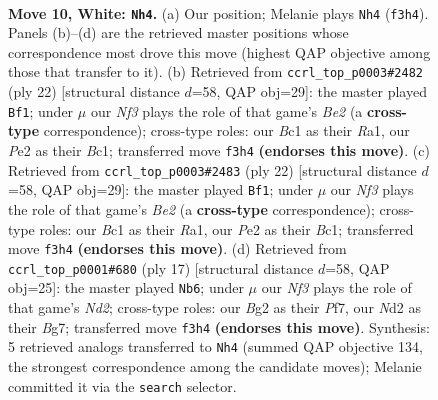 \documentclass[11pt]{article}
\begin{document}
\clearpage

\begin{figure}[p]\centering
\begin{subfigure}{0.46\textwidth}\centering
\resizebox{\linewidth}{!}{%
\newchessgame
\chessboard[
  setfen={r1bq1rk1/pp4pp/n1pb1n2/3p1p2/3P4/5NP1/PP1NPPBP/R1BQR1K1 w - - 4 10},
  showmover=false,
  pgfstyle=straightmove, color=movearrow, markmove={f3-h4}
]}
\caption{}
\end{subfigure}\hfill
\begin{subfigure}{0.46\textwidth}\centering
\resizebox{\linewidth}{!}{%
\newchessgame
\chessboard[
  setfen={2rq1rk1/ppn1ppbp/6pn/3p1b2/P2P4/5N2/1PPNBPPP/R1BQR1K1 w - - 1 12},
  showmover=false,
  pgfstyle=straightmove, color=movearrow, markmove={e2-f1}
]}
\caption{}
\end{subfigure}
\\[4pt]
\begin{subfigure}{0.46\textwidth}\centering
\resizebox{\linewidth}{!}{%
\newchessgame
\chessboard[
  setfen={2rq1rk1/ppn1ppbp/6pn/3p1b2/P2P4/5N2/1PPNBPPP/R1BQR1K1 w - - 1 12},
  showmover=false,
  pgfstyle=straightmove, color=movearrow, markmove={e2-f1}
]}
\caption{}
\end{subfigure}\hfill
\begin{subfigure}{0.46\textwidth}\centering
\resizebox{\linewidth}{!}{%
\newchessgame
\chessboard[
  setfen={r1bq1rk1/pp1nppbp/2p2np1/8/2NP4/5NP1/PPQ1PPBP/R1B2RK1 b - - 0 9},
  showmover=false,
  pgfstyle=straightmove, color=movearrow, markmove={d7-b6}
]}
\caption{}
\end{subfigure}
\caption{\textbf{Move 10, White: \texttt{Nh4}.} (a) Our position; Melanie plays \texttt{Nh4} (\texttt{f3h4}). Panels (b)--(d) are the retrieved master positions whose correspondence most drove this move (highest QAP objective among those that transfer to it). (b) Retrieved from \texttt{ccrl\_top\_p0003\#2482} (ply 22) [structural distance $d$=58, QAP obj=29]: the master played \texttt{Bf1}; under $\mu$ our \emph{Nf3} plays the role of that game's \emph{Be2} (a \textbf{cross-type} correspondence); cross-type roles: our \emph{B}c1 as their \emph{R}a1, our \emph{P}e2 as their \emph{B}c1; transferred move \texttt{f3h4} \textbf{(endorses this move)}. (c) Retrieved from \texttt{ccrl\_top\_p0003\#2483} (ply 22) [structural distance $d$=58, QAP obj=29]: the master played \texttt{Bf1}; under $\mu$ our \emph{Nf3} plays the role of that game's \emph{Be2} (a \textbf{cross-type} correspondence); cross-type roles: our \emph{B}c1 as their \emph{R}a1, our \emph{P}e2 as their \emph{B}c1; transferred move \texttt{f3h4} \textbf{(endorses this move)}. (d) Retrieved from \texttt{ccrl\_top\_p0001\#680} (ply 17) [structural distance $d$=58, QAP obj=25]: the master played \texttt{Nb6}; under $\mu$ our \emph{Nf3} plays the role of that game's \emph{Nd2}; cross-type roles: our \emph{B}g2 as their \emph{P}f7, our \emph{N}d2 as their \emph{B}g7; transferred move \texttt{f3h4} \textbf{(endorses this move)}. Synthesis: 5 retrieved analogs transferred to \texttt{Nh4} (summed QAP objective 134, the strongest correspondence among the candidate moves); Melanie committed it via the \texttt{search} selector.}
\label{fig:thought-m18}
\end{figure}
\end{document}
